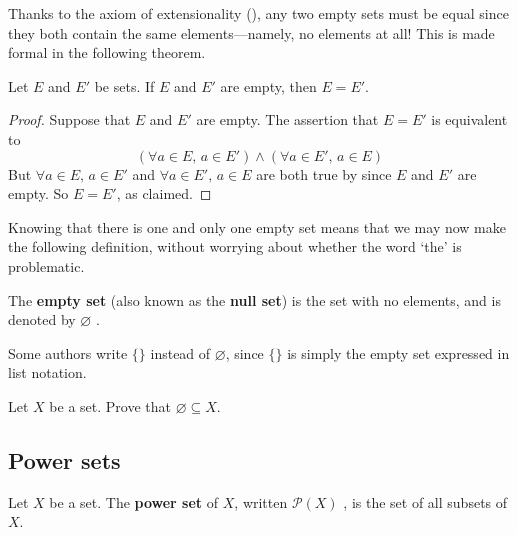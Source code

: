 Thanks to the axiom of extensionality (), any two empty sets must be equal since they both contain the same elements---namely, no elements at all! This is made formal in the following theorem.

\begin{theorem}
\label{thmEmptySetIsUnique}
Let $E$ and $E'$ be sets. If $E$ and $E'$ are empty, then $E=E'$.
\end{theorem}
\begin{proof}
Suppose that $E$ and $E'$ are empty. The assertion that $E=E'$ is equivalent to
\[ (\forall a \in E,\, a \in E') \wedge (\forall a \in E',\, a \in E) \]
But $\forall a \in E,\, a \in E'$ and $\forall a \in E',\, a \in E$ are both true by  since $E$ and $E'$ are empty. So $E=E'$, as claimed.
\end{proof}

Knowing that there is one and only one empty set means that we may now make the following definition, without worrying about whether the word `the' is problematic.

\begin{definition}
\label{defEmptySet}
The \textbf{empty set} (also known as the \textbf{null set}) is the set with no elements, and is denoted by $\varnothing$ .
\end{definition}

Some authors write $\{ \}$ instead of $\varnothing$, since $\{ \}$ is simply the empty set expressed in list notation.

\begin{exercise}
\label{exEmptySetSubsetOfEverySet}
Let $X$ be a set. Prove that $\varnothing \subseteq X$.
\end{exercise}

\subsection*{Power sets}

\begin{definition}
\label{defPowerSet}
Let $X$ be a set. The \textbf{power set} of $X$, written $\mathcal{P}(X)$ , is the set of all subsets of $X$.
\end{definition}

